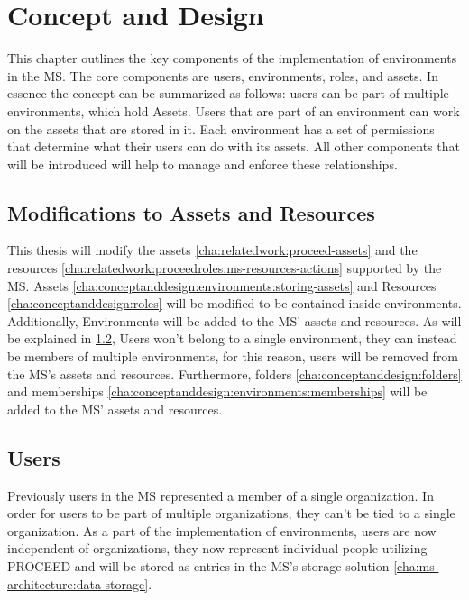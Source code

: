 \chapter{Concept and Design}
\label{cha:conceptanddesign}

This chapter outlines the key components of the implementation of environments in the MS.
The core components are users, environments, roles, and assets.
In essence the concept can be summarized as follows: users can be part of multiple
environments, which hold Assets.
Users that are part of an environment can work on the assets that are stored in it.
Each environment has a set of permissions that determine what their users can do with its
assets.
All other components that will be introduced will help to manage and enforce these relationships.

\section{Modifications to Assets and Resources}

This thesis will modify the assets \ref{cha:relatedwork:proceed-assets} and the resources
\ref{cha:relatedwork:proceedroles:ms-resources-actions} supported by the MS.
Assets \ref{cha:conceptanddesign:environments:storing-assets} and 
Resources \ref{cha:conceptanddesign:roles} will be modified to be contained inside environments.
Additionally, Environments will be added to the MS' assets and resources.
As will be explained in \ref{cha:conceptanddesign:users}, Users won't belong to a single
environment, they can instead be members of multiple environments, for this reason, 
users will be removed from the MS's assets and resources.
Furthermore, folders \ref{cha:conceptanddesign:folders} and  memberships
\ref{cha:conceptanddesign:environments:memberships} will be added to the MS' assets and
resources.

\section{Users}
\label{cha:conceptanddesign:users}

Previously users in the MS represented a member of a single organization.
In order for users to be part of multiple organizations, they can't be tied to a single
organization.
As a part of the implementation of environments, users are now independent of
organizations,
they now represent individual people utilizing PROCEED and will be stored as entries in
the MS's storage solution \ref{cha:ms-architecture:data-storage}.

